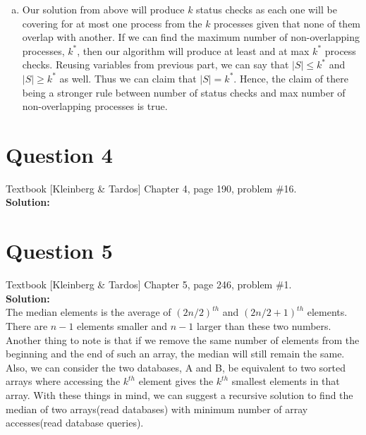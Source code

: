 \documentclass[11pt]{article}
\begin{document}
\begin{enumerate}[(a)]
\item Our solution from above will produce $ k $ status checks as each one will be covering for at most one process from the $ k $ processes given that none of them overlap with another. If we can find the maximum number of non-overlapping processes, $ k^* $, then our algorithm will produce at least and at max $ k^* $ process checks. Reusing variables from previous part, we can say that $ |S| \leq k^* $ and $ |S| \geq k^* $ as well. Thus we can claim that $ |S| = k^* $. Hence, the claim of there being a stronger rule between number of status checks and max number of non-overlapping processes is true.

\end{enumerate}

\clearpage
\section{Question 4} Textbook [Kleinberg \& Tardos] Chapter 4, page 190, problem \#16. \\
\textbf{Solution:} \\

\clearpage
\section{Question 5} Textbook [Kleinberg \& Tardos] Chapter 5, page 246, problem \#1. \\
\textbf{Solution:} \\

The median elements is the average of $ (2n/2)^{th} $ and $ (2n/2 + 1)^{th} $ elements. There are $ n-1 $ elements smaller and $ n-1 $ larger than these two numbers. Another thing to note is that if we remove the same number of elements from the beginning and the end of such an array, the median will still remain the same. Also, we can consider the two databases, A and B, be equivalent to two sorted arrays where accessing the $ k^{th} $ element gives the $ k^{th} $ smallest elements in that array. With these things in mind, we can suggest a recursive solution to find the median of two arrays(read databases) with minimum number of array accesses(read database queries). \\
\end{document}
